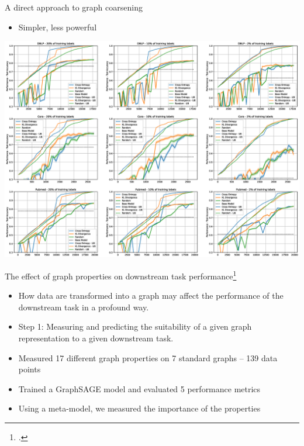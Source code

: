 \documentclass[10pt]{beamer}
\begin{document}
\begin{frame}{A direct approach to graph coarsening}
	\begin{itemize}
		\item Simpler, less powerful
	\end{itemize}

	\vspace{-25pt}

	\centering
	\includegraphics[width=\linewidth]{images/direct-graph-coarsening-results.eps}
\end{frame}

\begin{frame}{The effect of graph properties on downstream task performance\footcite{prochazka_which_2023}}
	\begin{itemize}
		\item<1-> How data are transformed into a graph may affect the performance of the downstream task in a profound way.
		\item<2-> Step 1: Measuring and predicting the suitability of a given graph representation to a given downstream task.
		\item<3-> Measured 17 different graph properties on 7 standard graphs -- 139 data points
		\item<4-> Trained a GraphSAGE model and evaluated 5 performance metrics
		\item<5-> Using a meta-model, we measured the importance of the properties
	\end{itemize}
\end{frame}
\end{document}

